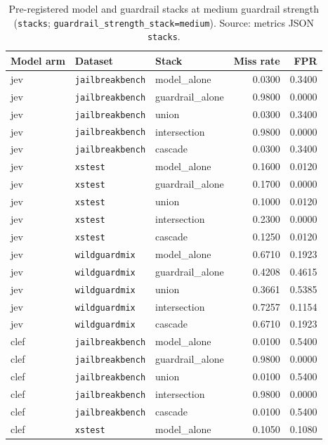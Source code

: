 \begin{table}[htbp]
\centering
\caption{Pre-registered model and guardrail stacks at medium guardrail strength (\texttt{stacks}; \texttt{guardrail\_strength\_stack=medium}). Source: metrics JSON \texttt{stacks}.}
\label{tab:stacks-preregistered}
\footnotesize
\begin{tabular}{@{}lllrr@{}}
\toprule
Model arm & Dataset & Stack & Miss rate & FPR \\
\midrule
jev & \texttt{jailbreakbench} & model\_alone & 0.0300 & 0.3400 \\
jev & \texttt{jailbreakbench} & guardrail\_alone & 0.9800 & 0.0000 \\
jev & \texttt{jailbreakbench} & union & 0.0300 & 0.3400 \\
jev & \texttt{jailbreakbench} & intersection & 0.9800 & 0.0000 \\
jev & \texttt{jailbreakbench} & cascade & 0.0300 & 0.3400 \\
jev & \texttt{xstest} & model\_alone & 0.1600 & 0.0120 \\
jev & \texttt{xstest} & guardrail\_alone & 0.1700 & 0.0000 \\
jev & \texttt{xstest} & union & 0.1000 & 0.0120 \\
jev & \texttt{xstest} & intersection & 0.2300 & 0.0000 \\
jev & \texttt{xstest} & cascade & 0.1250 & 0.0120 \\
jev & \texttt{wildguardmix} & model\_alone & 0.6710 & 0.1923 \\
jev & \texttt{wildguardmix} & guardrail\_alone & 0.4208 & 0.4615 \\
jev & \texttt{wildguardmix} & union & 0.3661 & 0.5385 \\
jev & \texttt{wildguardmix} & intersection & 0.7257 & 0.1154 \\
jev & \texttt{wildguardmix} & cascade & 0.6710 & 0.1923 \\
clef & \texttt{jailbreakbench} & model\_alone & 0.0100 & 0.5400 \\
clef & \texttt{jailbreakbench} & guardrail\_alone & 0.9800 & 0.0000 \\
clef & \texttt{jailbreakbench} & union & 0.0100 & 0.5400 \\
clef & \texttt{jailbreakbench} & intersection & 0.9800 & 0.0000 \\
clef & \texttt{jailbreakbench} & cascade & 0.0100 & 0.5400 \\
clef & \texttt{xstest} & model\_alone & 0.1050 & 0.1080 \\

\end{tabular}
\end{table}
